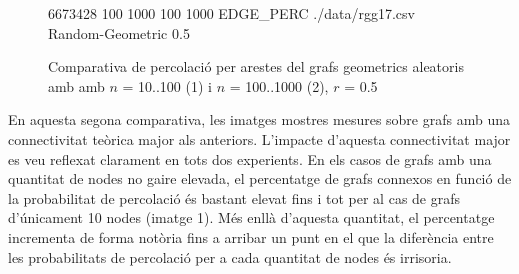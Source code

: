 \documentclass[a4paper]{article}
\begin{document}
\begin{figure}[h]
\begin{minipage}{0.45\textwidth}
			\footnotesize{6673428 100 1000 100 1000 EDGE\_PERC ./data/rgg17.csv Random-Geometric 0.5}
		\end{minipage}
		\caption{Comparativa de percolació per arestes del grafs geometrics aleatoris amb amb $n$ = 10..100 (1) i $n$ = 100..1000 (2), $r$ = 0.5}
		\label{fig:percolation_edges_rgg_0.5}
	\end{figure}

	En aquesta segona comparativa, les imatges mostres mesures sobre grafs amb una connectivitat teòrica major als anteriors. L'impacte d'aquesta connectivitat major es veu reflexat clarament en tots dos experients. En els casos de grafs amb una quantitat
	de nodes no gaire elevada, el percentatge de grafs connexos en funció de la probabilitat de percolació és bastant elevat fins i tot per al cas de grafs d'únicament 10 nodes (imatge 1). Més enllà d'aquesta quantitat, el percentatge incrementa de forma notòria
	fins a arribar un punt en el que la diferència entre les probabilitats de percolació per a cada quantitat de nodes és irrisoria.
\end{document}
